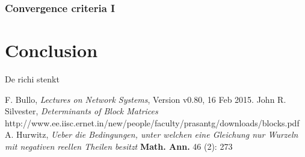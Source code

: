 \documentclass[conference]{IEEEtran}
\begin{document}
\subsubsection*{Convergence criteria I}

\section{Conclusion}

De richi stenkt 

\begin{thebibliography}{1}
F. Bullo, \emph{Lectures on Network Systems}, 
Version v0.80, 16 Feb 2015.
John R. Silvester, \emph{Determinants of Block Matrices}
http://www.ee.iisc.ernet.in/new/people/faculty/prasantg/downloads/blocks.pdf
A. Hurwitz, \emph{Ueber die Bedingungen, unter welchen eine Gleichung nur Wurzeln mit negativen reellen Theilen besitzt}
\textbf{Math. Ann.} 46 (2): 273 

\end{thebibliography}
\end{document}
